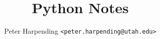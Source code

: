 \documentclass[12pt,letterpaper,oneside]{memoir}
\begin{document}
\title{Python Notes}
\author{Peter Harpending \texttt{<peter.harpending@utah.edu>}}
\maketitle

\tableofcontents



\printbibliography
\end{document}
